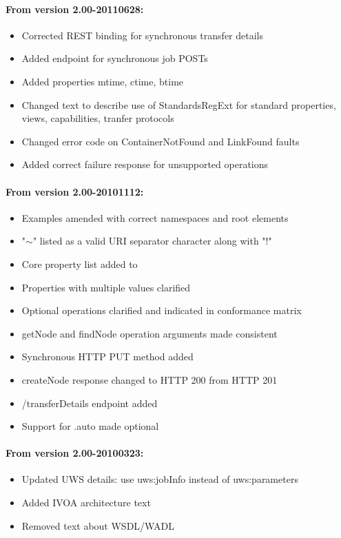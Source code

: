 \documentclass[11pt,a4paper]{ivoa}
\begin{document}
\paragraph{From version 2.00-20110628:}
\begin{itemize}
    \item Corrected REST binding for synchronous transfer details
    \item Added endpoint for synchronous job POSTs
    \item Added properties mtime, ctime, btime
    \item Changed text to describe use of StandardsRegExt for standard properties, views, capabilities, tranfer protocols
    \item Changed error code on ContainerNotFound and LinkFound faults
    \item Added correct failure response for unsupported operations
\end{itemize}

\paragraph{From version 2.00-20101112:}
\begin{itemize}
    \item Examples amended with correct namespaces and root elements
    \item "$\mathtt{\sim}$" listed as a valid URI separator character along with "!"
    \item Core property list added to
    \item Properties with multiple values clarified
    \item Optional operations clarified and indicated in conformance matrix
    \item getNode and findNode operation arguments made consistent
    \item Synchronous HTTP PUT method added
    \item createNode response changed to HTTP 200 from HTTP 201
    \item /{transferDetails} endpoint added
    \item Support for .auto made optional
\end{itemize}

\paragraph{From version 2.00-20100323:}
\begin{itemize}
    \item Updated UWS details: use uws:jobInfo instead of uws:parameters
    \item Added IVOA architecture text
    \item Removed text about WSDL/WADL
\end{itemize}


\end{document}
